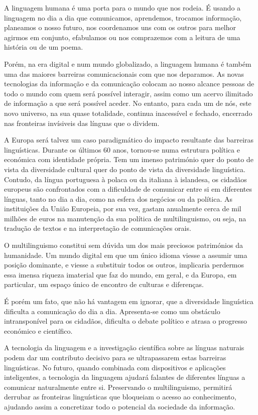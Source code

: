 \begin{multicols}{2}

A linguagem humana é uma porta para o mundo que nos rodeia. É usando a linguagem no dia a dia
que comunicamos, aprendemos, trocamos informação, planeamos o nosso futuro,
nos coordenamos uns com os outros para melhor agirmos em conjunto, efabulamos 
ou nos comprazemos com a leitura de uma história ou de um poema.

Porém, na era digital e num mundo globalizado, a linguagem humana é também 
uma das maiores barreiras comunicacionais com que nos deparamos. 
As novas tecnologias da informação e da comunicação colocam ao nosso alcance
pessoas de todo o mundo com quem será possível interagir, assim como 
um acervo ilimitado de informação a que será possível aceder. No entanto, para cada
um de nós, este novo universo, na sua quase totalidade, continua 
inacessível e fechado, encerrado nas fronteiras invísiveis das línguas que o dividem.

A Europa será talvez um caso paradigmático do impacto resultante das barreiras linguísticas. Durante os últimos 60 anos, tornou-se numa estrutura política e económica com identidade própria. Tem um imenso património quer do ponto de vista da diversidade cultural quer do ponto de vista da diversidade linguística. Contudo, da língua portuguesa à polaca ou da italiana à islandesa, os cidadãos europeus são confrontados com a dificuldade de comunicar entre si em diferentes línguas, tanto no dia a dia, como na esfera dos negócios ou da política. As instituições da União Europeia, por sua vez, gastam anualmente cerca de mil milhões de euros na manutenção da sua política de multilinguismo, ou seja, na tradução de textos e na interpretação de comunicações orais. 

O multilinguismo constitui sem dúvida um dos mais preciosos patrimónios da humanidade. Um mundo digital em que um único idioma viesse a  assumir uma posição dominante, 
e viesse a substituir todos os outros, implicaria perdermos essa imensa riqueza imaterial que faz do mundo, em geral, e da Europa, em particular, 
um espaço único de encontro de culturas e diferenças.

É porém um fato, que não há vantagem em ignorar, que a diversidade linguística dificulta a comunicação do dia a dia. Apresenta-se como um obs\-tá\-cu\-lo intransponível para os cidadãos, dificulta o debate político e atrasa o progresso económico e científico.

A tecnologia da linguagem e a investigação científica sobre as línguas naturais 
podem dar um contributo decisivo para se ultrapassarem estas barreiras linguísticas. 
No futuro, quando combinada com dispositivos e aplicações inteligentes, a tecnologia da linguagem ajudará falantes de diferentes línguas a comunicar naturalmente entre si. 
Preservando o multilinguismo, permitirá derrubar as fronteiras linguísticas que bloqueiam o acesso ao co\-nhe\-ci\-men\-to, 
ajudando assim a concretizar todo o potencial da sociedade da informação. 


\end{multicols}
